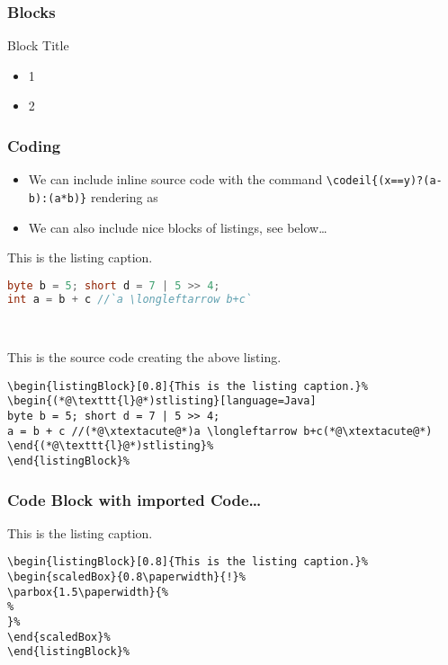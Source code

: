 \documentclass[mathserif]{beamer}%
\begin{document}
%
\begin{frame}%
\frametitle{Blocks}%
\begin{block}{Block Title}%
\begin{itemize}%
\item 1%
\item 2%
\end{itemize}%
\end{block}%
\end{frame}%
%
\begin{frame}[containsverbatim]%
\frametitle{Coding}%
\begin{itemize}%
\item We can include inline source code with the command \texttt{{\textbackslash}codeil\{(x==y)?(a-b):(a*b)\}} rendering as %
\item We can also include nice blocks of listings, see below\dots%
\end{itemize}%
\begin{center}%
\begin{listingBlock}[0.8]{This is the listing caption.}%
\begin{lstlisting}[language=Java]
byte b = 5; short d = 7 | 5 >> 4;
int a = b + c //`a \longleftarrow b+c`
\end{lstlisting}%
\end{listingBlock}\\%
\def\xtextacute{\texttt{\` }}%
\begin{listingBlock}[0.8]{This is the source code creating the above listing.}%
\begin{lstlisting}
\begin{listingBlock}[0.8]{This is the listing caption.}%
\begin{(*@\texttt{l}@*)stlisting}[language=Java]
byte b = 5; short d = 7 | 5 >> 4;
a = b + c //(*@\xtextacute@*)a \longleftarrow b+c(*@\xtextacute@*)
\end{(*@\texttt{l}@*)stlisting}%
\end{listingBlock}%
\end{lstlisting}%
\end{listingBlock}%
\end{center}%
\end{frame}%
%
%
\begin{frame}[containsverbatim]%
\frametitle{Code Block with imported Code\dots}%
\begin{center}%
\begin{listingBlock}[0.9]{This is the listing caption.}%
\begin{lstlisting}
\begin{listingBlock}[0.8]{This is the listing caption.}%
\begin{scaledBox}{0.8\paperwidth}{!}%
\parbox{1.5\paperwidth}{%
%
}%
\end{scaledBox}%
\end{listingBlock}%
\end{lstlisting}%
\end{listingBlock}%
\end{center}%
\end{frame}%
\end{document}
